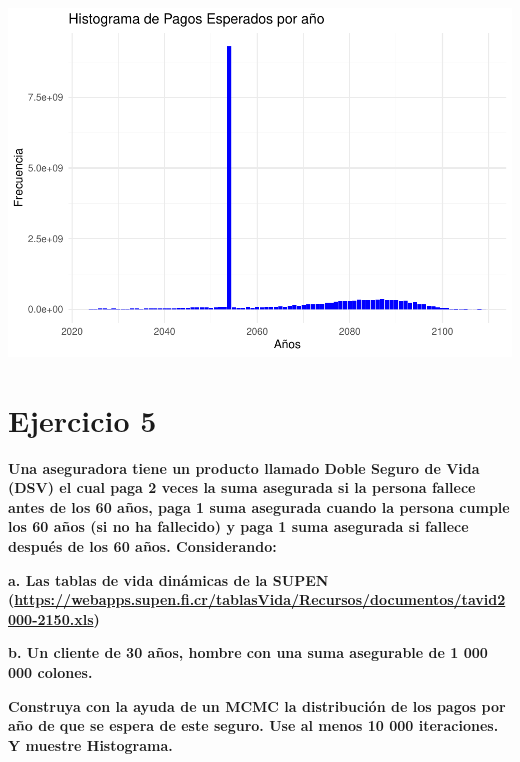 \documentclass[
]{article}
\newenvironment{Shaded}{\begin{snugshade}}{\end{snugshade}}
\newcommand{\AttributeTok}[1]{\textcolor[rgb]{0.13,0.29,0.53}{#1}}
\newcommand{\FunctionTok}[1]{\textcolor[rgb]{0.13,0.29,0.53}{\textbf{#1}}}
\newcommand{\NormalTok}[1]{#1}
\newcommand{\SpecialCharTok}[1]{\textcolor[rgb]{0.81,0.36,0.00}{\textbf{#1}}}
\newcommand{\StringTok}[1]{\textcolor[rgb]{0.31,0.60,0.02}{#1}}
\begin{document}
\begin{Shaded}
\end{Shaded}

\includegraphics{Rmarkdown_files/figure-latex/unnamed-chunk-8-1.pdf}

\hypertarget{ejercicio-5}{%
\section{Ejercicio 5}\label{ejercicio-5}}

\textbf{Una aseguradora tiene un producto llamado Doble Seguro de Vida
(DSV) el cual paga 2 veces la suma asegurada si la persona fallece antes
de los 60 años, paga 1 suma asegurada cuando la persona cumple los 60
años (si no ha fallecido) y paga 1 suma asegurada si fallece después de
los 60 años. Considerando:}

\textbf{a. Las tablas de vida dinámicas de la SUPEN
(\url{https://webapps.supen.fi.cr/tablasVida/Recursos/documentos/tavid2000-2150.xls})}

\textbf{b. Un cliente de 30 años, hombre con una suma asegurable de 1
000 000 colones.}

\textbf{Construya con la ayuda de un MCMC la distribución de los pagos
por año de que se espera de este seguro. Use al menos 10 000
iteraciones. Y muestre Histograma.}
\end{document}
